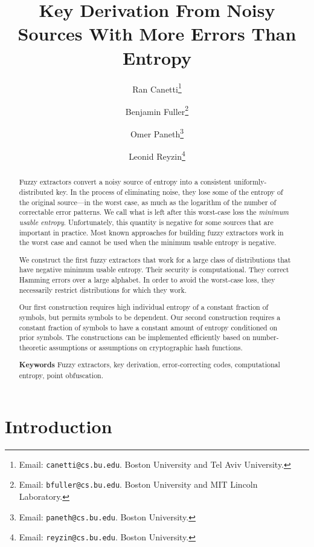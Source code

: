 \documentclass[11pt]{article}
\title{Key Derivation From Noisy Sources With More Errors Than Entropy}
\author{Ran Canetti\footnote{Email: {\tt canetti@cs.bu.edu}. Boston University and Tel Aviv University.} \and Benjamin Fuller\footnote{Email: {\tt bfuller@cs.bu.edu}.  Boston University and MIT Lincoln Laboratory.} \and Omer Paneth\footnote{Email: {\tt paneth@cs.bu.edu}. Boston University.} \and Leonid Reyzin\footnote{Email: {\tt reyzin@cs.bu.edu}.  Boston University.} }
\begin{document}
\maketitle


\begin{abstract}
Fuzzy extractors convert a noisy source of entropy into a consistent uniformly-distributed key.  In the process of eliminating noise, they  lose some of the entropy of the original source---in the worst case, as much as the logarithm of the number of correctable error patterns. We call what is left after this worst-case loss the \emph{minimum usable entropy}.  Unfortunately, this quantity is negative for some sources that are important in practice. Most known approaches for building fuzzy extractors work in the worst case and cannot be used when the minimum usable entropy is negative.

We construct the first fuzzy extractors that work for a large class of distributions that have negative minimum usable entropy. Their security is computational.  They correct Hamming errors over a large alphabet. In order to avoid the worst-case loss, they necessarily restrict distributions for which they work.

Our first construction requires high individual entropy of a constant fraction of symbols, but permits symbols to be dependent.  Our second construction requires  a constant fraction of symbols to have a constant amount of entropy conditioned on prior symbols. The constructions can be implemented efficiently based on number-theoretic assumptions or assumptions on cryptographic hash functions.

\bigskip

\textbf{Keywords} Fuzzy extractors, key derivation, error-correcting codes, computational entropy, point obfuscation.
\end{abstract}


\section{Introduction}\label{sec:introduction}
\end{document}
